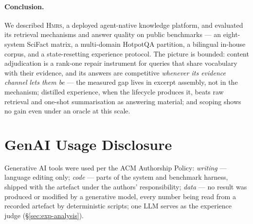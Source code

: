 \documentclass[sigconf, review, anonymous]{acmart}
\newcommand{\sys}{\textsc{Hmrs}}
\begin{document}
\paragraph{Conclusion.}
We described \sys{}, a deployed agent-native knowledge platform, and evaluated
its retrieval mechanisms and answer quality on public benchmarks --- an
eight-system SciFact matrix, a multi-domain HotpotQA partition, a bilingual
in-house corpus, and a state-resetting experience protocol. The picture is
bounded: content adjudication is a rank-one repair instrument for queries that
share vocabulary with their evidence, and its answers are competitive
\emph{whenever its evidence channel lets them be} --- the measured gap lives
in excerpt assembly, not in the mechanism; distilled experience, when the
lifecycle produces it, beats raw retrieval and one-shot summarisation as
answering material; and scoping shows no gain even under an oracle at this
scale.

\section*{GenAI Usage Disclosure}
Generative AI tools were used per the ACM Authorship Policy:
\emph{writing} --- language editing only; \emph{code} --- parts of the system
and benchmark harness, shipped with the artefact under the authors'
responsibility; \emph{data} --- no result was produced or modified by a
generative model, every number being read from a recorded artefact by
deterministic scripts; one LLM serves as the experience judge
(\S\ref{sec:exp-analysis}).

\balance


\end{document}
